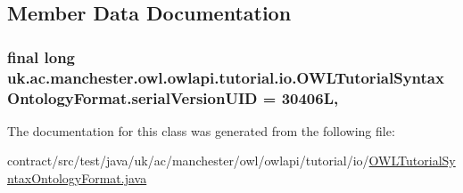 \subsection{Member Data Documentation}
\hypertarget{classuk_1_1ac_1_1manchester_1_1owl_1_1owlapi_1_1tutorial_1_1io_1_1_o_w_l_tutorial_syntax_ontology_format_a5d4c244d8e46e250172b8f0aaa549c6b}{
\subsubsection[{serial\-Version\-U\-I\-D}]{\setlength{\rightskip}{0pt plus 5cm}final long uk.\-ac.\-manchester.\-owl.\-owlapi.\-tutorial.\-io.\-O\-W\-L\-Tutorial\-Syntax\-Ontology\-Format.\-serial\-Version\-U\-I\-D = 30406\-L\hspace{0.3cm}{\ttfamily [static]}, {\ttfamily [private]}}}\label{classuk_1_1ac_1_1manchester_1_1owl_1_1owlapi_1_1tutorial_1_1io_1_1_o_w_l_tutorial_syntax_ontology_format_a5d4c244d8e46e250172b8f0aaa549c6b}


The documentation for this class was generated from the following file\-:\begin{DoxyCompactItemize}
\item 
contract/src/test/java/uk/ac/manchester/owl/owlapi/tutorial/io/\hyperlink{test_2java_2uk_2ac_2manchester_2owl_2owlapi_2tutorial_2io_2_o_w_l_tutorial_syntax_ontology_format_8java}{O\-W\-L\-Tutorial\-Syntax\-Ontology\-Format.\-java}\end{DoxyCompactItemize}
